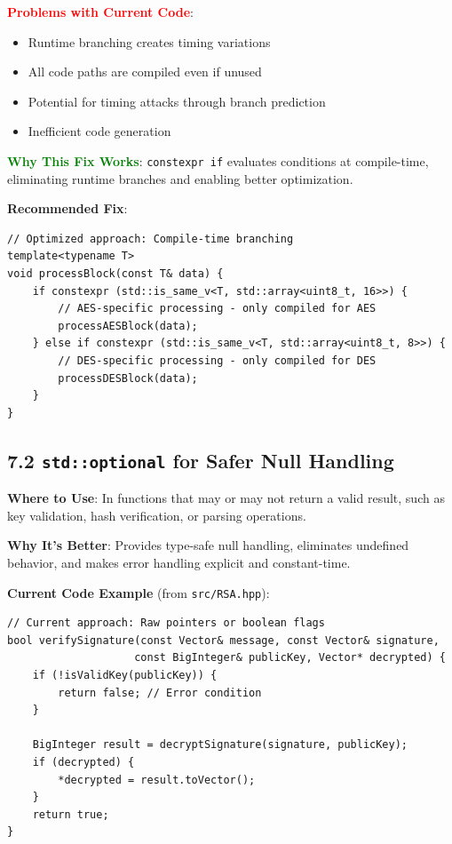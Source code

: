 \documentclass[11pt,a4paper]{article}
\begin{document}
\textcolor{red}{\textbf{Problems with Current Code}}:
\begin{itemize}
    \item Runtime branching creates timing variations
    \item All code paths are compiled even if unused
    \item Potential for timing attacks through branch prediction
    \item Inefficient code generation
\end{itemize}

\textcolor{green}{\textbf{Why This Fix Works}}: \texttt{constexpr if} evaluates conditions at compile-time, eliminating runtime branches and enabling better optimization.

\textbf{Recommended Fix}:
\begin{lstlisting}
// Optimized approach: Compile-time branching
template<typename T>
void processBlock(const T& data) {
    if constexpr (std::is_same_v<T, std::array<uint8_t, 16>>) {
        // AES-specific processing - only compiled for AES
        processAESBlock(data);
    } else if constexpr (std::is_same_v<T, std::array<uint8_t, 8>>) {
        // DES-specific processing - only compiled for DES
        processDESBlock(data);
    }
}
\end{lstlisting}

\subsection{7.2 \texttt{std::optional} for Safer Null Handling}

\textbf{Where to Use}: In functions that may or may not return a valid result, such as key validation, hash verification, or parsing operations.

\textbf{Why It's Better}: Provides type-safe null handling, eliminates undefined behavior, and makes error handling explicit and constant-time.

\textbf{Current Code Example} (from \texttt{src/RSA.hpp}):
\begin{lstlisting}
// Current approach: Raw pointers or boolean flags
bool verifySignature(const Vector& message, const Vector& signature, 
                    const BigInteger& publicKey, Vector* decrypted) {
    if (!isValidKey(publicKey)) {
        return false; // Error condition
    }
    
    BigInteger result = decryptSignature(signature, publicKey);
    if (decrypted) {
        *decrypted = result.toVector();
    }
    return true;
}
\end{lstlisting}
\end{document}
